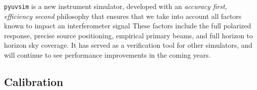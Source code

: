 \documentclass[a0,landscape]{a0poster}
\begin{document}
\begin{multicols}{4}
\texttt{pyuvsim} is a new instrument simulator, developed with an \emph{accuracy first, efficiency second} philosophy that ensures that we take into account all factors known to impact an interferometer signal  These factors include the full polarized response, precise source positioning, empirical primary beams, and full horizon to horizon sky coverage. It has served as a verification tool for other simulators, and will continue to see performance improvements in the coming years.




\subsection*{Calibration}



\end{multicols}
\end{document}
